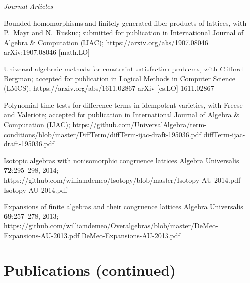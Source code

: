     {\it Journal Articles}\\[-6pt]
    \begin{enumerate}
      \pubitem
      {Bounded homomorphisms and finitely generated fiber products of lattices,}
      {with P.~Mayr and N.~Ruskuc; submitted for publication in}
      {International Journal of Algebra \& Computation {\small (IJAC)};}
      {}
      {https://arxiv.org/abs/1907.08046}
      {arXiv:1907.08046 [math.LO]}

      \pubitem
      {Universal algebraic methods for constraint satisfaction problems,}
      {with Clifford Bergman; accepted for publication in}
      {Logical Methods in Computer Science {\small (LMCS)};}
      {}
      {https://arxiv.org/abs/1611.02867}
      {arXiv [cs.LO] 1611.02867}
        
      \pubitem
      {Polynomial-time tests for difference terms in idempotent varieties,}
      {with Freese and Valeriote; accepted for publication in}
      {International Journal of Algebra \& Computation {\small (IJAC)};}
      {}
      {https://github.com/UniversalAlgebra/term-conditions/blob/master/DiffTerm/diffTerm-ijac-draft-195036.pdf}
      {diffTerm-ijac-draft-195036.pdf}
      
      \pubitem 
      {Isotopic algebras with nonisomorphic congruence lattices}
      {}  %
      {Algebra Universalis}
      {\textbf{72}:295--298, 2014;} 
      {https://github.com/williamdemeo/Isotopy/blob/master/Isotopy-AU-2014.pdf}
      {Isotopy-AU-2014.pdf}
      
      \pubitem 
      {Expansions of finite algebras and their congruence lattices}
      {}
      {Algebra Universalis}
      {\textbf{69}:257--278, 2013;}
      {https://github.com/williamdemeo/Overalgebras/blob/master/DeMeo-Expansions-AU-2013.pdf}
      {DeMeo-Expansions-AU-2013.pdf}

    \end{enumerate}

\newpage
    \section{\mysidestyle Publications (continued)}

